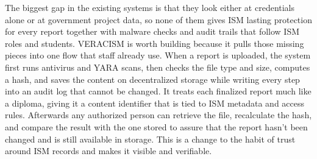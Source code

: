 The biggest gap in the existing systems is that they look either at credentials alone or at government project data, so none of them gives ISM lasting protection for every report together with malware checks and audit trails that follow ISM roles and students. VERACISM is worth building because it pulls those missing pieces into one flow that staff already use. When a report is uploaded, the system first runs antivirus and YARA scans, then checks the file type and size, computes a hash, and saves the content on decentralized storage while writing every step into an audit log that cannot be changed. It treats each finalized report much like a diploma, giving it a content identifier that is tied to ISM metadata and access rules. Afterwards any authorized person can retrieve the file, recalculate the hash, and compare the result with the one stored to assure that the report hasn't been changed and is still available in storage. This is a change to the habit of trust around ISM records and makes it visible and verifiable.
